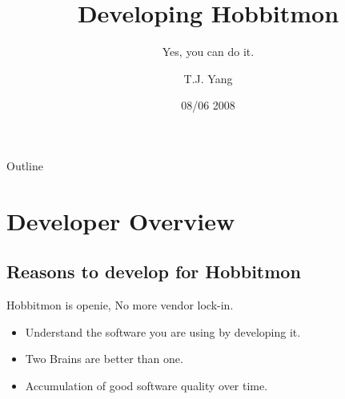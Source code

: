 \documentclass{beamer}
\title[Hobbitmon Development] %
{Developing Hobbitmon}
\subtitle {Yes, you can do it.} %
\author[Tyng-Jing Yang] %
{T.J. Yang }
\institute[Hobbitmon Monitor Community] %
{
  Hobbitmon Monitor Community}
\date[Short Occasion] %
{08/06 2008}
\begin{document}
\begin{frame}
  \titlepage
\end{frame}

\begin{frame}{Outline}
  \tableofcontents
\end{frame}




\section{Developer Overview}

\subsection[Why developing Hobbitmon ]{Reasons to develop for Hobbitmon}

\begin{frame}
{Hobbitmon is open}{ie, No more vendor lock-in.}

  \begin{itemize}
 \item
    Understand the software you are using by developing it.
   \item
    Two Brains are better than one. 
  \item
    Accumulation of good software quality over time.
  \end{itemize}
\end{frame}
\end{document}
